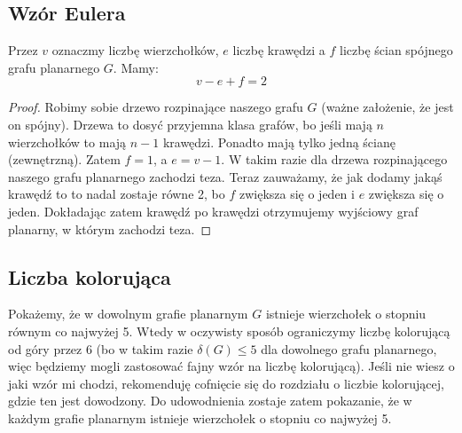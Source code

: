 \subsection{Wzór Eulera}
\begin{theorem}
	Przez $v$ oznaczmy liczbę wierzchołków, $e$ liczbę krawędzi a $f$ liczbę ścian spójnego grafu planarnego $G$. Mamy:
	\begin{equation}
		v - e + f = 2
	\end{equation}
\end{theorem}
\begin{proof}
	Robimy sobie drzewo rozpinające naszego grafu $G$ (ważne założenie, że jest on spójny). Drzewa to dosyć przyjemna klasa grafów, bo jeśli mają $n$ wierzchołków to mają $n-1$ krawędzi. Ponadto mają tylko jedną ścianę (zewnętrzną). Zatem $f = 1$, a $e = v-1$. W takim razie dla drzewa rozpinającego naszego grafu planarnego zachodzi teza. Teraz zauważamy, że jak dodamy jakąś krawędź to to nadal zostaje równe 2, bo $f$ zwiększa się o jeden i $e$ zwiększa się o jeden. Dokładając zatem krawędź po krawędzi otrzymujemy wyjściowy graf planarny, w którym zachodzi teza.
\end{proof}

\subsection{Liczba kolorująca}
Pokażemy, że w dowolnym grafie planarnym $G$ istnieje wierzchołek o stopniu równym co najwyżej 5. Wtedy w oczywisty sposób ograniczymy liczbę kolorującą od góry przez 6 (bo w takim razie $\delta(G) \leq 5$ dla dowolnego grafu planarnego, więc będziemy mogli zastosować fajny wzór na liczbę kolorującą). Jeśli nie wiesz o jaki wzór mi chodzi, rekomenduję cofnięcie się do rozdziału o liczbie kolorującej, gdzie ten jest dowodzony. Do udowodnienia zostaje zatem pokazanie, że w każdym grafie planarnym istnieje wierzchołek o stopniu co najwyżej 5.

